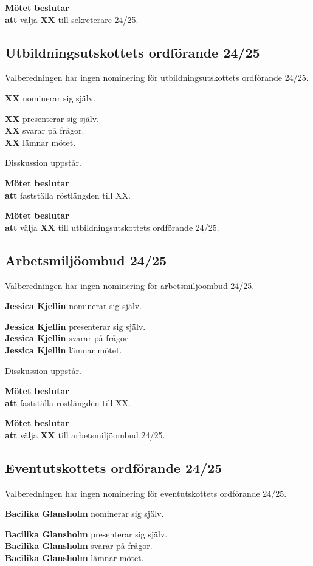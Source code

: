 \documentclass{datateknologsektionen-document}
\newcommand{\ind}{\hspace*{2em}}
\newcommand{\motetbeslutar}{\textbf{Mötet beslutar}}
\newcommand{\att}{\\\ind\textbf{att}}
\begin{document}
\motetbeslutar
\att{} välja \textbf{XX} till sekreterare 24/25.

\subsection{Utbildningsutskottets ordförande 24/25}

Valberedningen har ingen nominering för utbildningsutskottets ordförande 24/25.

\textbf{XX} nominerar sig själv.

\textbf{XX} presenterar sig själv.\\
\textbf{XX} svarar på frågor.\\
\textbf{XX} lämnar mötet.

Disskussion uppstår.

\motetbeslutar
\att{} fastställa röstlängden till XX.

\motetbeslutar
\att{} välja \textbf{XX} till utbildningsutskottets ordförande 24/25.

\subsection{Arbetsmiljöombud 24/25}

Valberedningen har ingen nominering för arbetsmiljöombud 24/25.

\textbf{Jessica Kjellin} nominerar sig själv.

\textbf{Jessica Kjellin} presenterar sig själv.\\
\textbf{Jessica Kjellin} svarar på frågor.\\
\textbf{Jessica Kjellin} lämnar mötet.

Disskussion uppstår.

\motetbeslutar
\att{} fastställa röstlängden till XX.

\motetbeslutar
\att{} välja \textbf{XX} till arbetsmiljöombud 24/25.

\subsection{Eventutskottets ordförande 24/25}

Valberedningen har ingen nominering för eventutskottets ordförande 24/25.

\textbf{Bacilika Glansholm} nominerar sig själv.

\textbf{Bacilika Glansholm} presenterar sig själv.\\
\textbf{Bacilika Glansholm} svarar på frågor.\\
\textbf{Bacilika Glansholm} lämnar mötet.
\end{document}
